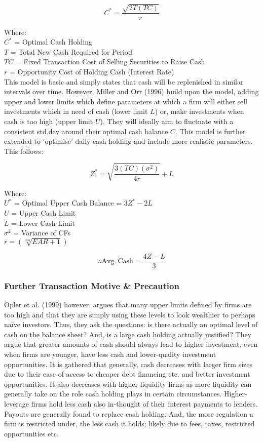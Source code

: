 \documentclass[11pt, english]{article}
\begin{document}
	$$C^*=\frac{\sqrt{2T(TC)}}{r}$$

	Where:\\
	$C^*$ = Optimal Cash Holding\\
	$T$ = Total New Cash Required for Period\\
	$TC$ = Fixed Transaction Cost of Selling Securities to Raise Cash\\
	$r$ = Opportunity Cost of Holding Cash (Interest Rate)\\

	This model is basic and simply states that cash will be replenished in similar intervals over time. However, Miller and Orr (1996) build upon the model, adding upper and lower limits which define parameters at which a firm will either sell investments which in need of cash (lower limit $L$) or, make investments when cash is too high (upper limit $U$). They will ideally aim to fluctuate with a consistent std.dev around their optimal cash balance $C$. This model is further extended to 'optimise' daily cash holding and include more realistic parameters. This follows:

	$$Z^*=\sqrt{\frac{3(TC)(\sigma^2)}{4r}}+L$$

	Where:\\
	$U^*$ = Optimal Upper Cash Balance = $3Z^*-2L$\\
	$U$ = Upper Cash Limit\\
	$L$ = Lower Cash Limit\\
	$\sigma^2$ = Variance of CFs\\
	$r=\left(\sqrt[365]{EAR+1}\right)$

	$$\therefore\mathrm{Avg.\ Cash}=\frac{4Z-L}{3}$$

		\subsubsection*{Further Transaction Motive \& Precaution}

	Opler et al. (1999) however, argues that many upper limits defined by firms are too high and that they are simply using these levels to look wealthier to perhaps naïve investors. Thus, they ask the questions: is there actually an optimal level of cash on the balance sheet? And, is a large cash holding actually justified? They argue that greater amounts of cash should always lead to higher investment, even when firms are younger, have less cash and lower-quality investment opportunities. It is gathered that generally, cash decreases with larger firm sizes due to their ease of access to cheaper debt financing etc. and better investment opportunities. It also decreases with higher-liquidity firms as more liquidity can generally take on the role cash holding plays in certain circumstances. Higher- leverage firms hold less cash also in-thought of their interest payments to lenders. Payouts are generally found to replace cash holding. And, the more regulation a firm is restricted under, the less cash it holds; likely due to fees, taxes, restricted opportunities etc.\\
\end{document}
